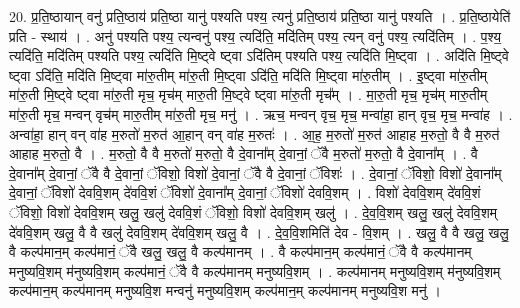 \documentclass[17pt]{extarticle}
\begin{document}
20. प्र॒ति॒ष्ठायान् वनु॑ प्रति॒ष्ठाय॑ प्रति॒ष्ठा यानु॑ पश्यति पश्य॒ त्यनु॑ प्रति॒ष्ठाय॑ प्रति॒ष्ठा यानु॑ पश्यति । . प्र॒ति॒ष्ठायेति॑ प्रति - स्थाय॑ । . अनु॑ पश्यति पश्य॒ त्यन्वनु॑ पश्य॒ त्यदि॑ति॒ मदि॑तिम् पश्य॒ त्यन् वनु॑ पश्य॒ त्यदि॑तिम् । . प॒श्य॒ त्यदि॑ति॒ मदि॑तिम् पश्यति पश्य॒ त्यदि॑ति मि॒ष्ट्वे ष्ट्वा ऽदि॑तिम् पश्यति पश्य॒ त्यदि॑ति मि॒ष्ट्वा । . अदि॑ति मि॒ष्ट्वे ष्ट्वा ऽदि॑ति॒ मदि॑ति मि॒ष्ट्वा मा॑रु॒तीम् मा॑रु॒ती मि॒ष्ट्वा ऽदि॑ति॒ मदि॑ति मि॒ष्ट्वा मा॑रु॒तीम् । . इ॒ष्ट्वा मा॑रु॒तीम् मा॑रु॒ती मि॒ष्ट्वे ष्ट्वा मा॑रु॒ती मृच॒ मृच॑म् मारु॒ती मि॒ष्ट्वे ष्ट्वा मा॑रु॒ती मृच᳚म् । . मा॒रु॒ती मृच॒ मृच॑म् मारु॒तीम् मा॑रु॒ती मृच॒ मन्वन् वृच॑म् मारु॒तीम् मा॑रु॒ती मृच॒ मनु॑ । . ऋच॒ मन्वन् वृच॒ मृच॒ मन्वा॑हा॒ हान् वृच॒ मृच॒ मन्वा॑ह । . अन्वा॑हा॒ हान् वन् वा॑ह म॒रुतो॑ म॒रुत॑ आ॒हान् वन् वा॑ह म॒रुतः॑ । . आ॒ह॒ म॒रुतो॑ म॒रुत॑ आहाह म॒रुतो॒ वै वै म॒रुत॑ आहाह म॒रुतो॒ वै । . म॒रुतो॒ वै वै म॒रुतो॑ म॒रुतो॒ वै दे॒वाना᳚म् दे॒वानां॒ ॅवै म॒रुतो॑ म॒रुतो॒ वै दे॒वाना᳚म् । . वै दे॒वाना᳚म् दे॒वानां॒ ॅवै वै दे॒वानां॒ ॅविशो॒ विशो॑ दे॒वानां॒ ॅवै वै दे॒वानां॒ ॅविशः॑ । . दे॒वानां॒ ॅविशो॒ विशो॑ दे॒वाना᳚म् दे॒वानां॒ ॅविशो॑ देववि॒शम् दे॑ववि॒शं ॅविशो॑ दे॒वाना᳚म् दे॒वानां॒ ॅविशो॑ देववि॒शम् । . विशो॑ देववि॒शम् दे॑ववि॒शं ॅविशो॒ विशो॑ देववि॒शम् खलु॒ खलु॑ देववि॒शं ॅविशो॒ विशो॑ देववि॒शम् खलु॑ । . दे॒व॒वि॒शम् खलु॒ खलु॑ देववि॒शम् दे॑ववि॒शम् खलु॒ वै वै खलु॑ देववि॒शम् दे॑ववि॒शम् खलु॒ वै । . दे॒व॒वि॒शमिति॑ देव - वि॒शम् । . खलु॒ वै वै खलु॒ खलु॒ वै कल्प॑मान॒म् कल्प॑मानं॒ ॅवै खलु॒ खलु॒ वै कल्प॑मानम् । . वै कल्प॑मान॒म् कल्प॑मानं॒ ॅवै वै कल्प॑मानम् मनुष्यवि॒शम् म॑नुष्यवि॒शम् कल्प॑मानं॒ ॅवै वै कल्प॑मानम् मनुष्यवि॒शम् । . कल्प॑मानम् मनुष्यवि॒शम् म॑नुष्यवि॒शम् कल्प॑मान॒म् कल्प॑मानम् मनुष्यवि॒श मन्वनु॑ मनुष्यवि॒शम् कल्प॑मान॒म् कल्प॑मानम् मनुष्यवि॒श मनु॑ । \newline
\end{document}
